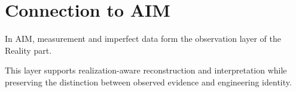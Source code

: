 \section{Connection to AIM}

\begin{summary}
In AIM, measurement and imperfect data form the observation layer of the
Reality part.

This layer supports realization-aware reconstruction and interpretation
while preserving the distinction between observed evidence and
engineering identity.
\end{summary}
